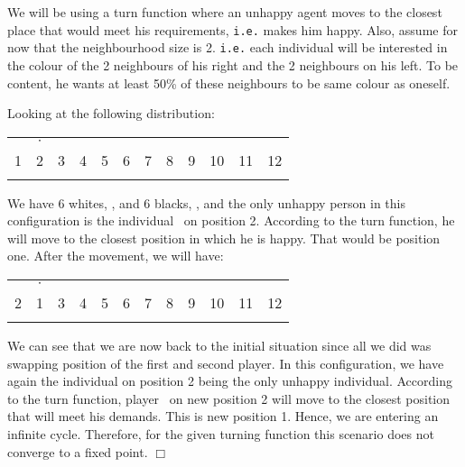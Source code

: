 \documentclass[../main.tex]{subfiles}
\begin{document}
We will be using a turn function where an unhappy agent moves to the closest place that would meet his requirements, \verb|i.e.| makes him happy. Also, assume for now that the neighbourhood size is 2. \verb|i.e.| each individual will be interested in the colour of the 2 neighbours of his right and the 2 neighbours on his left. To be content, he wants at least 50\% of these neighbours to be same colour as oneself.

Looking at the following distribution:

\begin{table}[ht]
\begin{center}
{\begin{tabular}{| c |c| c| c| c |c| c |c| c |c |c |c |}
\hline
 & $\cdot$ &  & & & &  & &  & & &\\
1 & 2 &3 &4 &5 &6  &7 &8 & 9 & 10 &11&12\\
\x & \x &\z &\z &\z &\z  &\z &\z &\x &\x &\x & \x \\
 \hline
\end{tabular}}
\end{center}
\end{table}
We have 6 whites, \z, and 6 blacks, \x, and the only unhappy person in this configuration is the individual \x\ on position 2. According to the turn function, he will move to the closest position in which he is happy. That would be position one. After the movement, we will have:


\begin{table}[ht]
\begin{center}
{\begin{tabular}{| c |c| c| c| c |c| c |c| c |c |c |c |}
\hline
 & $\cdot$ &  & & & &  & &  & & & \\
2 & 1 &3 &4 &5 &6  &7 &8 & 9 & 10 &11 & 12\\
\x & \x &\z &\z &\z &\z  &\z &\z &\x &\x &\x & \x \\
 \hline
\end{tabular}}
\end{center}
\end{table}

We can see that we are now back to the initial situation since all we did was swapping position of the first and second player. In this configuration, we have again the individual on position 2 being the only unhappy individual. According to the turn function, player \x\ on new position 2 will move to the closest position that will meet his demands. This is new position 1. Hence, we are entering an infinite cycle. Therefore, for the given turning function this scenario does not converge to a fixed point. $ \Box $ \\
\end{document}
